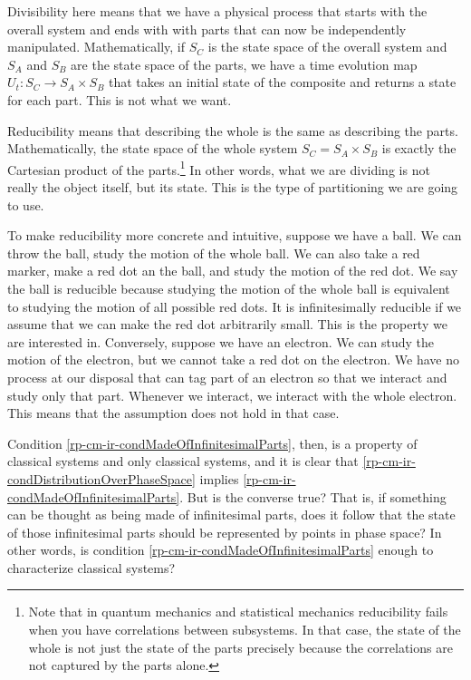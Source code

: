 Divisibility here means that we have a physical process that starts with the overall system and ends with with parts that can now be independently manipulated. Mathematically, if $S_C$ is the state space of the overall system and $S_A$ and $S_B$ are the state space of the parts, we have a time evolution map $U_t : S_C \to S_A \times S_B$ that takes an initial state of the composite and returns a state for each part. This is not what we want.

Reducibility means that describing the whole is the same as describing the parts. Mathematically, the state space of the whole system $S_C = S_A \times S_B$ is exactly the Cartesian product of the parts.\footnote{Note that in quantum mechanics and statistical mechanics reducibility fails when you have correlations between subsystems. In that case, the state of the whole is not just the state of the parts precisely because the correlations are not captured by the parts alone.} In other words, what we are dividing is not really the object itself, but its state. This is the type of partitioning we are going to use.

To make reducibility more concrete and intuitive, suppose we have a ball. We can throw the ball, study the motion of the whole ball. We can also take a red marker, make a red dot an the ball, and study the motion of the red dot. We say the ball is reducible because studying the motion of the whole ball is equivalent to studying the motion of all possible red dots. It is infinitesimally reducible if we assume that we can make the red dot arbitrarily small. This is the property we are interested in. Conversely, suppose we have an electron. We can study the motion of the electron, but we cannot take a red dot on the electron. We have no process at our disposal that can tag part of an electron so that we interact and study only that part. Whenever we interact, we interact with the whole electron. This means that the assumption does not hold in that case.

Condition \ref{rp-cm-ir-condMadeOfInfinitesimalParts}, then, is a property of classical systems and only classical systems, and it is clear that \ref{rp-cm-ir-condDistributionOverPhaseSpace} implies \ref{rp-cm-ir-condMadeOfInfinitesimalParts}. But is the converse true? That is, if something can be thought as being made of infinitesimal parts, does it follow that the state of those infinitesimal parts should be represented by points in phase space? In other words, is condition \ref{rp-cm-ir-condMadeOfInfinitesimalParts} enough to characterize classical systems?


